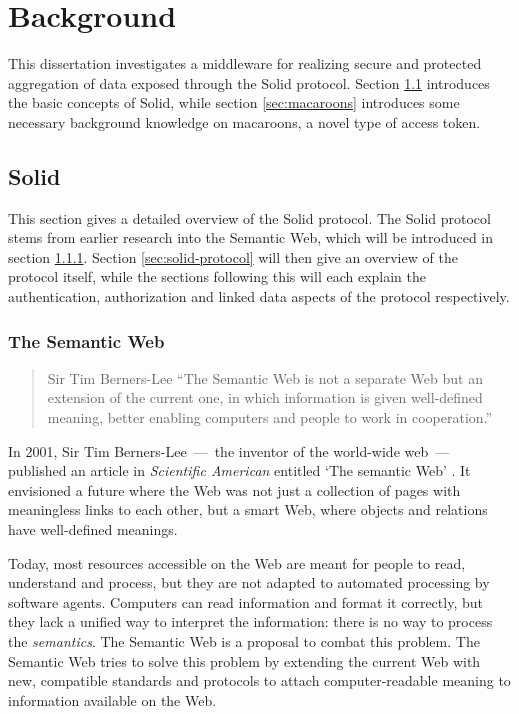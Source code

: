 \chapter{Background}
\label{cha:background}
This dissertation investigates a middleware for realizing secure and protected aggregation of data exposed through the Solid protocol. Section \ref{sec:solid} introduces the basic concepts of Solid, while section \ref{sec:macaroons} introduces some necessary background knowledge on macaroons, a novel type of access token.

\section{Solid}
\label{sec:solid}
This section gives a detailed overview of the Solid protocol. The Solid protocol stems from earlier research into the Semantic Web, which will be introduced in section \ref{sec:semantic-web}. Section \ref{sec:solid-protocol} will then give an overview of the protocol itself, while the sections following this will each explain the authentication, authorization and linked data aspects of the protocol respectively.

\subsection{The Semantic Web}
\label{sec:semantic-web}
\begin{quote}{Sir Tim Berners-Lee}
    ``The Semantic Web is not a separate Web but an extension of the current one, in which information is given well-defined meaning, better enabling computers and people to work in cooperation.''
\end{quote}

\noindent In 2001, Sir Tim Berners-Lee \,---\, the inventor of the world-wide web \,---\, published an article in \textit{Scientific American} entitled `The semantic Web' \citep{semantic-web}. It envisioned a future where the Web was not just a collection of pages with meaningless links to each other, but a smart Web, where objects and relations have well-defined meanings.

Today, most resources accessible on the Web are meant for people to read, understand and process, but they are not adapted to automated processing by software agents. Computers can read information and format it correctly, but they lack a unified way to interpret the information: there is no way to process the \textit{semantics}. The Semantic Web is a proposal to combat this problem. The Semantic Web tries to solve this problem by extending the current Web with new, compatible standards and protocols to attach computer-readable meaning to information available on the Web.


